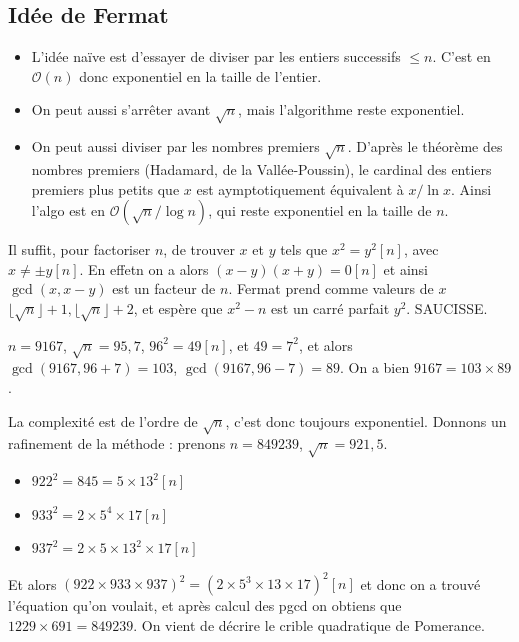         \subsection{Idée de Fermat}
            \begin{itemize}
                \item L'idée naïve est d'essayer de diviser par les entiers successifs $\leq n$. C'est en $\mathcal{O}(n)$ donc exponentiel en la taille de l'entier.
                \item On peut aussi s'arrêter avant $\sqrt{n}$, mais l'algorithme reste exponentiel.
                \item On peut aussi diviser par les nombres premiers $\sqrt{n}$. D'après le théorème des nombres premiers (Hadamard, de la Vallée-Poussin), le cardinal des entiers premiers plus petits que $x$ est aymptotiquement équivalent à $x/\ln x$. Ainsi l'algo est en $\mathcal{O}(\sqrt{n}/\log n)$, qui reste exponentiel en la taille de $n$.
            \end{itemize}
            Il suffit, pour factoriser $n$, de trouver $x$ et $y$ tels que $x^2 = y^2 [n]$, avec $x \neq \pm y [n]$. En effetn on a alors $(x - y)(x + y) = 0 [n]$ et ainsi $\gcd (x, x-y)$ est un facteur de $n$. Fermat prend comme valeurs de $x$ $\lfloor \sqrt{n} \rfloor + 1, \lfloor \sqrt{n} \rfloor + 2$, et espère que $x^2 - n$ est un carré parfait $y^2$. SAUCISSE. 
            \begin{expl}
                $n = 9167$, $\sqrt{n} = 95,7$, $96^2 = 49 [n]$, et $49 = 7^2$, et alors $\gcd (9167, 96+7) = 103$, $\gcd (9167, 96 - 7) = 89$. On a bien $9167 = 103 \times 89$.
            \end{expl} \noindent
            La complexité est de l'ordre de $\sqrt{n}$, c'est donc toujours exponentiel. Donnons un rafinement de la méthode : prenons $n = 849239$, $\sqrt{n} = 921,5$.
            \begin{itemize}
                \item $922^2 = 845 = 5 \times 13^2 [n]$
                \item $933^2 = 2 \times 5^4 \times 17 [n]$
                \item $937^2 = 2 \times 5 \times 13^2 \times 17 [n]$
            \end{itemize}
            Et alors $(922 \times 933 \times 937)^2 = (2 \times 5^3 \times 13 \times 17)^2 [n]$ et donc on a trouvé l'équation qu'on voulait, et après calcul des pgcd on obtiens que $1229 \times 691 = 849239$. On vient de décrire le crible quadratique de Pomerance. 
            
